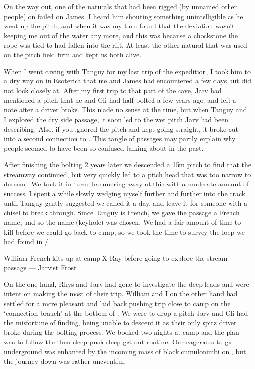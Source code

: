 On the way out, one of the naturals that had been rigged (by unnamed other people) on  failed on James. I heard him shouting something unintelligible as he went up the pitch, and when it was my turn found that the deviation wasn't keeping me out of the water any more, and this was because a chockstone the rope was tied to had fallen into the rift. At least the other natural that was used on the pitch held firm and kept us both alive.


When I went caving with Tanguy for my last trip of the expedition, I took him to a dry way on in Esoterica that me and James had encountered a few days but did not look closely at. After my first trip to that part of the cave, Jarv had mentioned a pitch that he and Oli had half bolted a few years ago, and left a note after a driver broke. This made no sense at the time, but when Tanguy and I explored the dry side passage, it soon led to the wet pitch Jarv had been describing. Also, if you ignored the pitch and kept going straight, it broke out into a second connection to . This tangle of passages may partly explain why people seemed to have been so confused talking about  in the past. 

After finishing the bolting 2 years later we descended a 15m pitch to find that the streamway continued, but very quickly led to a pitch head that was too narrow to descend. We took it in turns hammering away at this with a moderate amount of success. I spent a while slowly wedging myself further and further into the crack until Tanguy gently suggested we called it a day, and leave it for someone with a chisel to break through. Since Tanguy is French, we gave the passage a French name, and so the name  (keyhole) was chosen. We had a fair amount of time to kill before we could go back to camp, so we took the time to survey the loop we had found in  / .

\begin{marginfigure}
\centering
{}
\label{Will at camp}
\caption{William French kits up at camp X-Ray before going to explore the  stream passage --- Jarvist Frost}
\end{marginfigure}

On the one hand, Rhys and Jarv had gone to investigate the deep leads and were intent on making the most of their trip. William and I on the other hand had settled for a more pleasant and laid back pushing trip close to camp on the `connection branch' at the bottom of . We were to drop a pitch Jarv and Oli had the misfortune of finding, being unable to descent it as their only spitz driver broke during the bolting process. We booked two nights at camp  and the plan was to follow the then sleep-push-sleep-get out routine. Our eagerness to go underground was enhanced by the incoming mass of black cumulonimbi on , but the journey down was rather uneventful.

